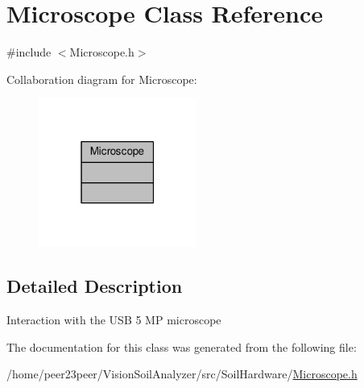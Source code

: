 \hypertarget{class_microscope}{}\section{Microscope Class Reference}
\label{class_microscope}


{\ttfamily \#include $<$Microscope.\+h$>$}



Collaboration diagram for Microscope\+:\nopagebreak
\begin{figure}[H]
\begin{center}
\leavevmode
\includegraphics[width=147pt]{class_microscope__coll__graph}
\end{center}
\end{figure}


\subsection{Detailed Description}
Interaction with the U\+S\+B 5 M\+P microscope 

The documentation for this class was generated from the following file\+:\begin{DoxyCompactItemize}
\item 
/home/peer23peer/\+Vision\+Soil\+Analyzer/src/\+Soil\+Hardware/\hyperlink{_microscope_8h}{Microscope.\+h}\end{DoxyCompactItemize}
